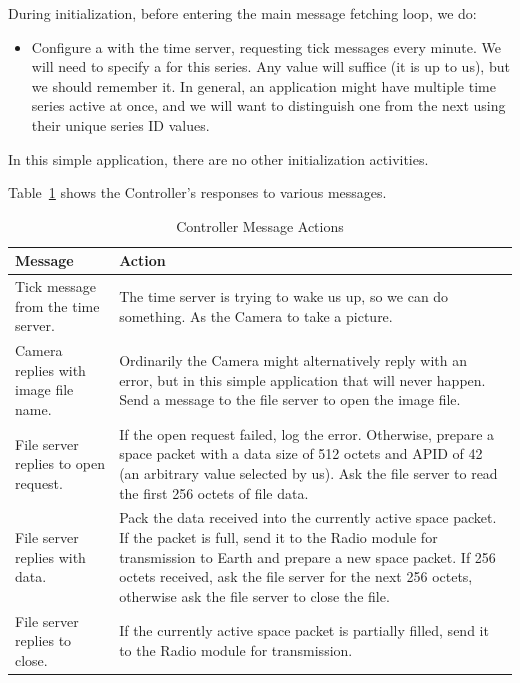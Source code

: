 During initialization, before entering the main message fetching loop, we do:

\begin{itemize}
\item Configure a  with the time server, requesting tick messages every
minute. We will need to specify a  for this series. Any value will suffice
(it is up to us), but we should remember it. In general, an application might have multiple time
series active at once, and we will want to distinguish one from the next using their unique
series ID values.
\end{itemize}

In this simple application, there are no other initialization activities.

Table~\ref{tbl:controller-message-actions} shows the Controller's responses to various messages.

\begin{table}[ht]
    \centering
    \caption{Controller Message Actions}
    \label{tbl:controller-message-actions}
    \renewcommand{\arraystretch}{1.5} %
    \begin{tabularx}{\textwidth}{|>{\hsize=0.35\hsize}X|>{\hsize=0.65\hsize}X|}
        \hline
        \textbf{Message} & \textbf{Action} \\
        \hline \hline
        Tick message from the time server. & 
        
        The time server is trying to wake us up, so we can do something. As the Camera to take a
        picture. \\
        \hline
        Camera replies with image file name. &
        
        Ordinarily the Camera might alternatively reply with an error, but in this simple
        application that will never happen. Send a message to the file server to open the image
        file. \\
        \hline
        File server replies to open request. &
        
        If the open request failed, log the error. Otherwise, prepare a space packet with a data
        size of 512 octets and APID of 42 (an arbitrary value selected by us). Ask the file
        server to read the first 256 octets of file data. \\
        \hline
        File server replies with data. &

        Pack the data received into the currently active space packet. If the packet is full,
        send it to the Radio module for transmission to Earth and prepare a new space packet. If
        256 octets received, ask the file server for the next 256 octets, otherwise ask the file
        server to close the file. \\
        \hline
        File server replies to close. &

        If the currently active space packet is partially filled, send it to the Radio module
        for transmission. \\
        \hline
    \end{tabularx}
\end{table}

